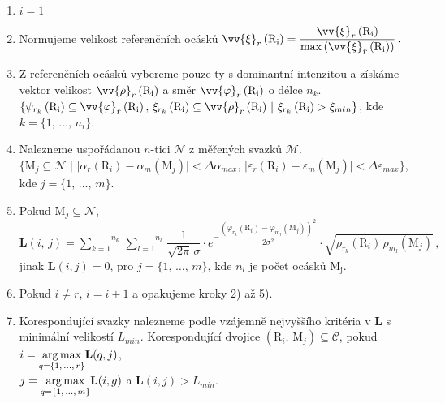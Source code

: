 \begin{enumerate}
\item $i = 1$

\item Normujeme velikost referenčních ocásků $\vv{\xi}_r\left( \mathrm{R_i} \right) = \dfrac{\vv{\xi}_r\left( \mathrm{R_i} \right)}{\max \left( \vv{\xi}_r\left( \mathrm{R_i} \right) \right)}\,.$

\item Z referenčních ocásků vybereme pouze ty s dominantní intenzitou a získáme vektor velikost $\vv{\rho}_{r}\left(\mathrm{R_i}\right)$ a směr $\vv{\varphi}_{r}\left(\mathrm{R_i}\right)$ o délce $n_k$.\\ $\lbrace \psi_{r_k}\left(\mathrm{R_i}\right) \subseteq \vv{\varphi}_{r}\left(\mathrm{R_i}\right),\, \xi_{r_k}\left(\mathrm{R_i}\right) \subseteq \vv{\rho}_{r}\left(\mathrm{R_i}\right)\,|\,\, \xi_{r_k}\left(\mathrm{R_i}\right) > \xi_{min} \rbrace$, kde $k =\lbrace 1,\,\dots,\,n_i\rbrace $.

\item Nalezneme uspořádanou $n$-tici $\mathcal{N}$ z měřených svazků $\mathcal{M}$. \\$\lbrace \mathrm{M}_j \subseteq \mathcal{N} \,\,|\,\,|\alpha_r(\mathrm{R}_i) - \alpha_m(\mathrm{M}_j) | < \Delta\alpha_{max},\, |\varepsilon_r(\mathrm{R}_i) - \varepsilon_m(\mathrm{M}_j) | < \Delta\varepsilon_{max} \rbrace$, kde $j =\lbrace 1,\,\dots,\,m \rbrace $.


\item Pokud $ \mathrm{M}_j \subseteq \mathcal{N}$, \\
  $\mathbf{L}(i,\,j) = \overset{n_k}{\underset{{k = 1}}{\sum}}\, \overset{n_l}{\underset{{l = 1}}{\sum}}\,\dfrac{1}{\sqrt{2\pi}\, \sigma}\cdot e^{-\dfrac{\left(\varphi_{r_k}(\mathrm{R}_i)- \varphi_{m_l}(\mathrm{M}_j) \right)^2}{2\sigma^2}} \cdot \sqrt{\rho_{r_k}(\mathrm{R}_i)\, \rho_{m_l}(\mathrm{M}_j)}\,,$
  \\jinak $\mathbf{L}(i,j) = 0$, pro $j =\lbrace 1,\,\dots,\,m \rbrace $, kde $n_l$ je počet ocásků $\mathrm{M_j}$.
  

\item Pokud $i \neq r$, $i = i+1$ a opakujeme kroky 2) až 5).

\item Korespondující svazky nalezneme podle vzájemně nejvyššího kritéria v $\mathbf{L}$ s minimální velikostí $L_{min}$. Korespondující dvojice $\left(\mathrm{R}_i,\,\mathrm{M}_j \right) \subseteq \mathcal{C}$, pokud  $i = \underset{{q = \lbrace1,\,\dots,\,r\rbrace}}{\operatorname*{arg\,max}}\mathbf{L}(q,j)$,\\ $j = \underset{{q = \lbrace1,\,\dots,\,m\rbrace}}{\operatorname*{arg\,max}}\mathbf{L}(i,g)$ a  $\mathbf{L}(i,j) > L_{min}$. 

\end{enumerate}

